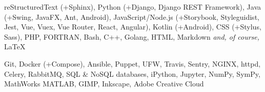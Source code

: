
\sectiondescription
{
reStructuredText (+Sphinx),
Python (+Django, Django REST Framework),
Java (+Swing, JavaFX, Ant, Android),
JavaScript/Node.js (+Storybook, Styleguidist, Jest, Vue, Vuex, Vue Router, React, Angular),
Kotlin (+Android),
CSS (+Stylus, Sass),
PHP, FORTRAN,
Bash, C++, Golang,
HTML, Markdown
\textit{and, of course,} {\selectfont\LaTeX}
}

\sectiondescription
{
Git,
Docker (+Compose),
Ansible, Puppet, UFW,
Travis, Sentry,
NGINX, httpd, Celery, RabbitMQ, SQL \& NoSQL databases,
iPython, Jupyter, NumPy, SymPy, MathWorks MATLAB,
GIMP, Inkscape, Adobe Creative Cloud
}
